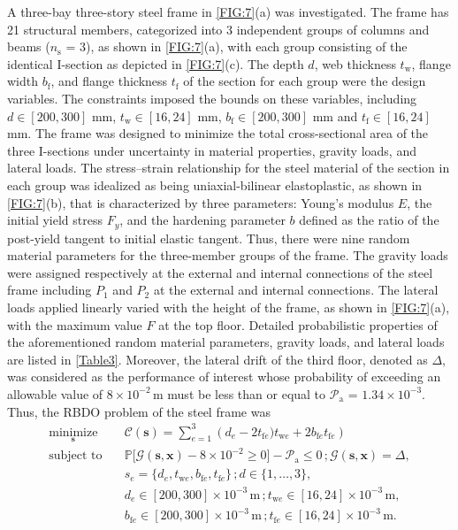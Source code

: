 \documentclass[preprint,3p]{elsarticle}
\begin{document}
\begin{linenumbers}
A three-bay three-story steel frame \cite{Xu2019} in \cref{FIG:7}(a) was investigated. The frame has 21 structural members, categorized into 3 independent groups of columns and beams ($n_\text{s}$ = 3), as shown in \cref{FIG:7}(a), with each group consisting of the identical I-section as depicted in \cref{FIG:7}(c). The depth $d$, web thickness $t_\text{w}$, flange width $b_\text{f}$, and flange thickness $t_\text{f}$ of the section for each group were the design variables. The constraints imposed the bounds on these variables, including $d \in [200, 300]$ mm, $t_\text{w} \in [16, 24]$ mm, $b_\text{f} \in [200, 300]$ mm and $t_\text{f} \in [16, 24]$ mm. The frame was designed to minimize the total cross-sectional area of the three I-sections under uncertainty in material properties, gravity loads, and lateral loads. The stress–strain relationship for the steel material of the section in each group was idealized as being uniaxial-bilinear elastoplastic, as shown in \cref{FIG:7}(b), that is characterized by three parameters: Young’s modulus $E$, the initial yield stress $F_y$, and the hardening parameter $b$ defined as the ratio of the post-yield tangent to initial elastic tangent. Thus, there were nine random material parameters for the three-member groups of the frame. The gravity loads were assigned respectively at the external and internal connections of the steel frame including $P_1$ and $P_2$ at the external and internal connections. The lateral loads applied linearly varied with the height of the frame, as shown in \cref{FIG:7}(a), with the maximum value $F$ at the top floor. Detailed probabilistic properties of the aforementioned random material parameters, gravity loads, and lateral loads are listed in \cref{Table3}. Moreover, the lateral drift of the third floor, denoted as $\Delta$, was considered as the performance of interest whose probability of exceeding an allowable value of $8\times10^{-2}\,\text{m}$ must be less than or equal to $\mathcal{P}_\text{a}$ = $1.34\times10^{-3}$. Thus, the RBDO problem of the steel frame was 
\begin{equation}
    \begin{aligned}
        \underset{\textbf{s}}{\text{minimize}} \quad & \mathcal{C}(\textbf{s}) = \displaystyle\sum_{e=1}^{3} \left(d_e-2t_{\text{f}e})t_{\text{w}e}+2b_{\text{f}e}t_{\text{f}e}\right)\\
        \text{subject to} \quad &
        \mathbb{P}\bigl[\mathcal{G}(\textbf{s},\textbf{x})-8\times10^{-2} \geq 0\bigr]-\mathcal{P}_{\text{a}} \leq 0 \,; \mathcal{G}(\textbf{s},\textbf{x}) = \Delta,\\
        & s_e =\{d_e,t_{\text{w}e},b_{\text{f}e},t_{\text{f}e}\} \,; d \in \{1,\dots,3\},\\
        & d_e \in [200,300]\times10^{-3}\,\text{m}\,; t_{\text{w}e} \in [16,24]\times10^{-3}\,\text{m},\\
        & b_{\text{f}e} \in [200,300]\times10^{-3}\,\text{m}\,; t_{\text{f}e} \in [16,24]\times10^{-3}\,\text{m}.
    \end{aligned}
    \label{EQ:27}
\end{equation}


\end{linenumbers}
\end{document}
